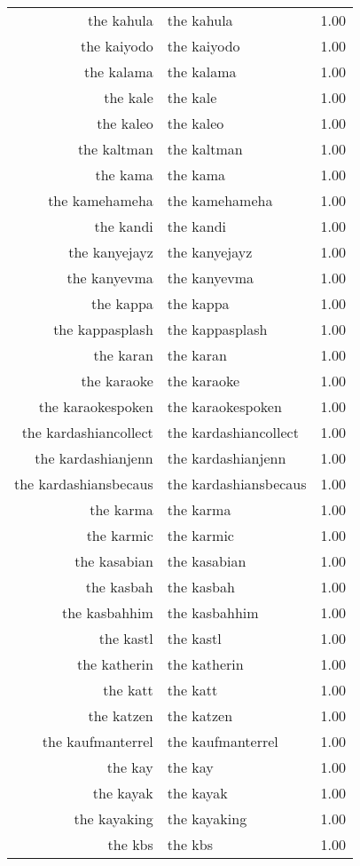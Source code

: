\begin{table}[ht]
\begin{tabular}{rlr}
  the kahula & the kahula & 1.00 \\ 
  the kaiyodo & the kaiyodo & 1.00 \\ 
  the kalama & the kalama & 1.00 \\ 
  the kale & the kale & 1.00 \\ 
  the kaleo & the kaleo & 1.00 \\ 
  the kaltman & the kaltman & 1.00 \\ 
  the kama & the kama & 1.00 \\ 
  the kamehameha & the kamehameha & 1.00 \\ 
  the kandi & the kandi & 1.00 \\ 
  the kanyejayz & the kanyejayz & 1.00 \\ 
  the kanyevma & the kanyevma & 1.00 \\ 
  the kappa & the kappa & 1.00 \\ 
  the kappasplash & the kappasplash & 1.00 \\ 
  the karan & the karan & 1.00 \\ 
  the karaoke & the karaoke & 1.00 \\ 
  the karaokespoken & the karaokespoken & 1.00 \\ 
  the kardashiancollect & the kardashiancollect & 1.00 \\ 
  the kardashianjenn & the kardashianjenn & 1.00 \\ 
  the kardashiansbecaus & the kardashiansbecaus & 1.00 \\ 
  the karma & the karma & 1.00 \\ 
  the karmic & the karmic & 1.00 \\ 
  the kasabian & the kasabian & 1.00 \\ 
  the kasbah & the kasbah & 1.00 \\ 
  the kasbahhim & the kasbahhim & 1.00 \\ 
  the kastl & the kastl & 1.00 \\ 
  the katherin & the katherin & 1.00 \\ 
  the katt & the katt & 1.00 \\ 
  the katzen & the katzen & 1.00 \\ 
  the kaufmanterrel & the kaufmanterrel & 1.00 \\ 
  the kay & the kay & 1.00 \\ 
  the kayak & the kayak & 1.00 \\ 
  the kayaking & the kayaking & 1.00 \\ 
  the kbs & the kbs & 1.00 \\ 

\end{tabular}
\end{table}
